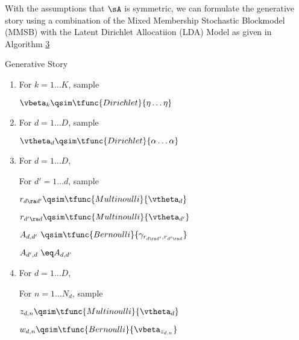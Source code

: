 \documentclass{article}
\begin{document}
\begin{question}

	With the assumptions that $\sA$ is symmetric, we can formulate the generative story using a combination of the Mixed Membership Stochastic Blockmodel (MMSB) with the Latent Dirichlet Allocatiion (LDA) Model as given in Algorithm \hyperlink{algo:3}{3}

	\begin{algo}[0.9\textwidth]{Generative Story}

		\begin{enumerate}
			\item For $k = 1 \dots K$, sample \sbr

				\hspace{1.5em} $\vbeta_k \qsim \tfunc{Dirichlet}{\eta \dots \eta}$ \sbr

			\item For $d = 1 \dots D$, sample \sbr

				\hspace{1.5em} $\vtheta_d \qsim \tfunc{Dirichlet}{\alpha \dots \alpha}$ \sbr

			\item For $d = 1 \dots D$,

				\begin{addmargin}{1em}
					For $d' = 1 \dots d$, sample \sbr

					\begin{addmargin}{1.5em}
						$r_{d \ra d'} \qsim \tfunc{Multinoulli}{\vtheta_d}$

						$r_{d' \ra d} \qsim \tfunc{Multinoulli}{\vtheta_{d'}}$

						$A_{d, d'} \ \qsim \tfunc{Bernoulli}{\gamma_{r_{d \ra d'}, r_{d' \ra d}}}$

						$A_{d', d} \ \eq A_{d, d'}$

					\end{addmargin}
				\end{addmargin}

			\item For $d = 1 \dots D$,

				\begin{addmargin}{1em}
					For $n = 1 \dots N_d$, sample \sbr

					\begin{addmargin}{1.5em}
						$z_{d, n} \qsim \tfunc{Multinoulli}{\vtheta_d}$

						$w_{d, n} \qsim \tfunc{Bernoulli}{\vbeta_{z_{d, n}}}$

					\end{addmargin}
				\end{addmargin}


\end{enumerate}
\end{algo}
\end{question}
\end{document}
